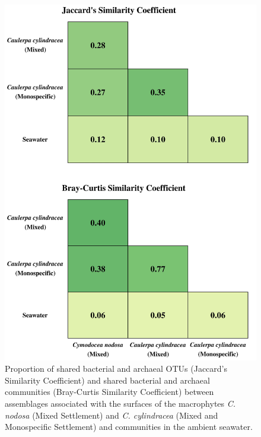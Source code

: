 \documentclass[12pt,]{article}
\begin{document}
\begin{figure}[H]

{\centering \includegraphics[width=0.7\linewidth]{../results/figures/matrix} 

}

\caption{Proportion of shared bacterial and archaeal OTUs (Jaccard's Similarity Coefficient) and shared bacterial and archaeal communities (Bray-Curtis Similarity Coefficient) between assemblages associated with the surfaces of the macrophytes \textit{C. nodosa} (Mixed Settlement) and \textit{C. cylindracea} (Mixed and Monospecific Settlement) and communities in the ambient seawater.\label{matrix}}\label{fig:unnamed-chunk-1}
\end{figure}
\end{document}
